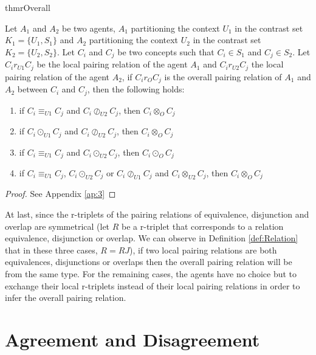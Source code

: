 \begin{restatable}{thm}{rOverall}
\label{thm:ROverall}

Let $A_{1}$ and $A_{2}$ be two agents, $A_{1}$ partitioning the context $U_{1}$ in the contrast set $K_{1} = \{ U_{1}, S_{1} \}$ and $A_{2}$ partitioning the context $U_{2}$ in the contrast set $K_{2} = \{ U_{2}, S_{2}\}$. Let $C_{i}$ and $C_{j}$ be two concepts such that $C_{i} \in S_{1}$ and $C_{j} \in S_{2}$. Let $C_{i} r_{U1} C_{j}$ be the local pairing relation of the agent $A_{1}$ and $C_{i} r_{U2} C_{j}$ the local pairing relation of the agent $A_{2}$, if $C_{i} r_{O} C_{j}$ is the overall pairing relation of $A_{1}$ and $A_{2}$ between $C_{i}$ and $C_{j}$, then the following holds:

\begin{enumerate}
\item if $C_{i} \equiv_{U1} C_{j}$ and $C_{i} \oslash_{U2} C_{j}$, then $C_{i} \otimes_{O} C_{j}$ %
\item if $C_{i} \odot_{U1} C_{j}$ and $C_{i} \oslash_{U2} C_{j}$, then $C_{i} \otimes_{O} C_{j}$ %
\item if $C_{i} \equiv_{U1} C_{j}$ and $C_{i} \odot_{U2} C_{j}$, then $C_{i} \odot_{O} C_{j}$ %
\item if $C_{i} \equiv_{U1} C_{j}$, $C_{i} \odot_{U2} C_{j}$ or $C_{i} \oslash_{U1} C_{j}$ and $C_{i} \otimes_{U2} C_{j}$, then $C_{i} \otimes_{O} C_{j}$ %
\end{enumerate}

\end{restatable}

\begin{proof}
See Appendix \ref{ap:3}
\end{proof}

At last, since the r-triplets of the pairing relations of equivalence, disjunction and overlap are symmetrical (let $R$ be a r-triplet that corresponds to a relation equivalence, disjunction or overlap. We can observe in Definition \ref{def:Relation} that in these three cases, $R = RJ$), if two local pairing relations are both equivalences, disjunctions or overlaps then the overall pairing relation will be from the same type. For the remaining cases, the agents have no choice but to exchange their local r-triplets instead of their local pairing relations in order to infer the overall pairing relation.

\section{Agreement and Disagreement}\label{sec:AgreeDisagree}

